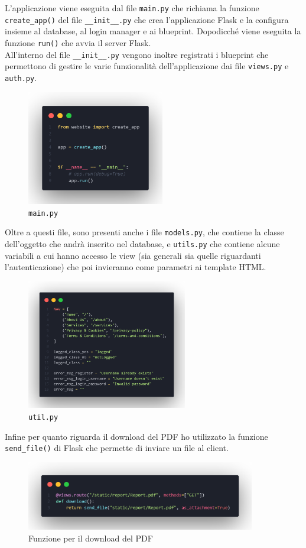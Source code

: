\documentclass[12pt]{article}
\def\code#1{\texttt{#1}}
\begin{document}
L'applicazione viene eseguita dal file \code{main.py} che richiama la funzione \code{create\_app()} del file \code{\_\_init\_\_.py} che crea l'applicazione Flask e la configura insieme al database, al login manager e ai blueprint. Dopodicché viene eseguita la funzione \code{run()} che avvia il server Flask. \\
All'interno del file \code{\_\_init\_\_.py} vengono inoltre registrati i blueprint che permettono di gestire le varie funzionalità dell'applicazione dai file \code{views.py} e \code{auth.py}.
\vskip 0.1cm
\begin{figure}[h]
    \includegraphics[width=6cm]{main.png}
    \centering
    \caption{\code{main.py}}
\end{figure}
\vskip 0.5cm
\noindent
Oltre a questi file, sono presenti anche i file \code{models.py}, che contiene la classe dell'oggetto che andrà inserito nel database, e \code{utils.py} che contiene alcune variabili a cui hanno accesso le view (sia generali sia quelle riguardanti l'autenticazione) che poi invieranno come parametri ai template HTML.
\vskip 0.1cm
\begin{figure}[h]
    \includegraphics[width=7cm]{util.png}
    \centering
    \caption{\code{util.py}}
\end{figure}
\vskip 0.5cm
\noindent
Infine per quanto riguarda il download del PDF ho utilizzato la funzione \code{send\_file()} di Flask che permette di inviare un file al client.
\vskip 0.1cm
\begin{figure}[h]
    \includegraphics[width=10cm]{pdf.png}
    \centering
    \caption{Funzione per il download del PDF}
\end{figure}
\end{document}
